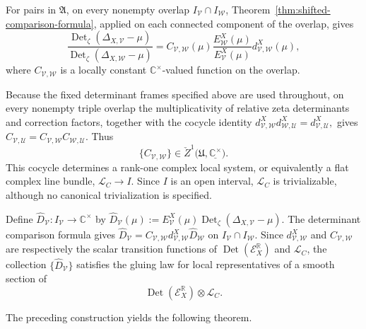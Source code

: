 \documentclass[12pt]{amsart}
\theoremstyle{plain}
\theoremstyle{definition}
\theoremstyle{remark}
\numberwithin{equation}{section} \numberwithin{figure}{section}
\renewcommand*{\to}{\rightarrow}
\newcommand{\mb}[1]{\mathbb{#1}} %
\newcommand{\mc}[1]{\mathcal{#1}}
\begin{document}
For pairs in \(\mathfrak A\), on every nonempty overlap
\(I_{\mc V}\cap I_{\mc W}\),
Theorem~\ref{thm:shifted-comparison-formula}, applied on each
connected component of the overlap, gives
\[
    \frac{
        \operatorname{Det}_{\zeta}
        (\Delta_{X,\mc V}-\mu)
    }{
        \operatorname{Det}_{\zeta}
        (\Delta_{X,\mc W}-\mu)
    }
    =
    C_{\mc V,\mc W}(\mu)
    \frac{E_{\mc W}^X(\mu)}{E_{\mc V}^X(\mu)}
    d_{\mc V,\mc W}^X(\mu),
\]
where \(C_{\mc V,\mc W}\) is a locally constant
\(\mb C^\times\)-valued function on the overlap.

Because the fixed determinant frames specified above are used
throughout, on every nonempty triple overlap the multiplicativity of
relative zeta determinants and correction factors, together with the cocycle
identity
\(
d_{\mc V,\mc W}^X d_{\mc W,\mc U}^X
=d_{\mc V,\mc U}^X,
\)
gives
\(
C_{\mc V,\mc U}
=C_{\mc V,\mc W}C_{\mc W,\mc U}.
\)
Thus
\[
    \{C_{\mc V,\mc W}\}
    \in
    \check Z^1
    \bigl(
        \mathfrak U,
        \underline{\mb C^\times}
    \bigr).
\]
This cocycle determines a rank-one complex local system, or
equivalently a flat complex line bundle, \(\mc L_C\to I\). Since
\(I\) is an open interval, \(\mc L_C\) is trivializable, although no
canonical trivialization is specified.

Define
\(
    \widehat D_{\mc V}:I_{\mc V}\to\mb C^\times
\)
by
\(
    \widehat D_{\mc V}(\mu)
    :=
    E_{\mc V}^X(\mu)
    \operatorname{Det}_{\zeta}
    (\Delta_{X,\mc V}-\mu).
\)
The determinant comparison formula gives
\(
    \widehat D_{\mc V}
    =
    C_{\mc V,\mc W}
    d_{\mc V,\mc W}^X
    \widehat D_{\mc W}
\)
on \(I_{\mc V}\cap I_{\mc W}\). Since
\(d_{\mc V,\mc W}^X\) and \(C_{\mc V,\mc W}\) are respectively the
scalar transition functions of
\(\operatorname{Det}(\mc E_X^{\mb R})\) and \(\mc L_C\), the
collection \(\{\widehat D_{\mc V}\}\) satisfies the gluing law for
local representatives of a smooth section of
\[
    \operatorname{Det}(\mc E_X^{\mb R})
    \otimes
    \mc L_C.
\]

The preceding construction yields the following theorem.
\end{document}
